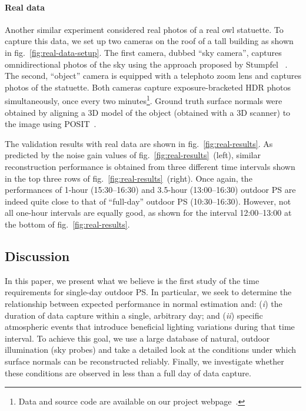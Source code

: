 \paragraph{Real data}%
%
Another similar experiment considered real photos of a real owl statuette. To capture this data, we set up two cameras on the roof of a tall building as shown in fig.~\ref{fig:real-data-setup}. The first camera, dubbed ``sky camera'', captures omnidirectional photos of the sky using the approach proposed by Stumpfel \etal~\cite{stumpfel-afrigraph-04}. The second, ``object'' camera is equipped with a telephoto zoom lens and captures photos of the statuette. Both cameras capture exposure-bracketed HDR photos simultaneously, once every two minutes\footnote{Data and source code are available on our project webpage~\cite{webpageXhourPS}.}. Ground truth surface normals were obtained by aligning a 3D model of the object (obtained with a 3D scanner) to the image using POSIT~\cite{dementhon1995model}. 

The validation results with real data are shown in fig.~\ref{fig:real-results}. As predicted by the noise gain values of fig.~\ref{fig:real-results}~(left), similar reconstruction performance is obtained from three different time intervals shown in the top three rows of fig.~\ref{fig:real-results}~(right). Once again, the performances of 1-hour (15:30--16:30) and 3.5-hour (13:00--16:30) outdoor PS are indeed quite close to that of ``full-day'' outdoor PS (10:30--16:30). However, not all one-hour intervals are equally good, as shown for the interval 12:00--13:00 at the bottom of fig.~\ref{fig:real-results}.


\subsection{Discussion}
\label{sec:3dv-discussion}

In this paper, we present what we believe is the first study of the time requirements for single-day outdoor PS. In particular, we seek to determine the relationship between expected performance in normal estimation and: (\emph{i}) the duration of data capture within a single, arbitrary day; and (\emph{ii}) specific atmospheric events that introduce beneficial lighting variations during that time interval. To achieve this goal, we use a large database of natural, outdoor illumination (sky probes) and take a detailed look at the conditions under which surface normals can be reconstructed reliably. \mbox{Finally,} we investigate whether these conditions are observed in less than a full day of data capture.

